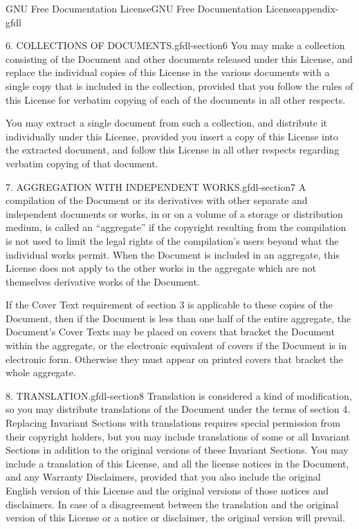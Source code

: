 \documentclass[oneside,10pt,]{book}
\numberwithin{equation}{section}
\begin{document}
\begin{appendixptx}{GNU Free Documentation License}{}{GNU Free Documentation License}{}{}{appendix-gfdl}
\begin{paragraphs}{6. COLLECTIONS OF DOCUMENTS.}{gfdl-section6}
You may make a collection consisting of the Document and other documents released under this License, and replace the individual copies of this License in the various documents with a single copy that is included in the collection, provided that you follow the rules of this License for verbatim copying of each of the documents in all other respects.%
\par
\hypertarget{p-746}{}%
You may extract a single document from such a collection, and distribute it individually under this License, provided you insert a copy of this License into the extracted document, and follow this License in all other respects regarding verbatim copying of that document.%
\end{paragraphs}%
\begin{paragraphs}{7. AGGREGATION WITH INDEPENDENT WORKS.}{gfdl-section7}%
\hypertarget{p-747}{}%
A compilation of the Document or its derivatives with other separate and independent documents or works, in or on a volume of a storage or distribution medium, is called an ``aggregate'' if the copyright resulting from the compilation is not used to limit the legal rights of the compilation's users beyond what the individual works permit. When the Document is included in an aggregate, this License does not apply to the other works in the aggregate which are not themselves derivative works of the Document.%
\par
\hypertarget{p-748}{}%
If the Cover Text requirement of section 3 is applicable to these copies of the Document, then if the Document is less than one half of the entire aggregate, the Document's Cover Texts may be placed on covers that bracket the Document within the aggregate, or the electronic equivalent of covers if the Document is in electronic form. Otherwise they must appear on printed covers that bracket the whole aggregate.%
\end{paragraphs}%
\begin{paragraphs}{8. TRANSLATION.}{gfdl-section8}%
\hypertarget{p-749}{}%
Translation is considered a kind of modification, so you may distribute translations of the Document under the terms of section 4. Replacing Invariant Sections with translations requires special permission from their copyright holders, but you may include translations of some or all Invariant Sections in addition to the original versions of these Invariant Sections. You may include a translation of this License, and all the license notices in the Document, and any Warranty Disclaimers, provided that you also include the original English version of this License and the original versions of those notices and disclaimers. In case of a disagreement between the translation and the original version of this License or a notice or disclaimer, the original version will prevail.%

\end{paragraphs}
\end{appendixptx}
\end{document}
